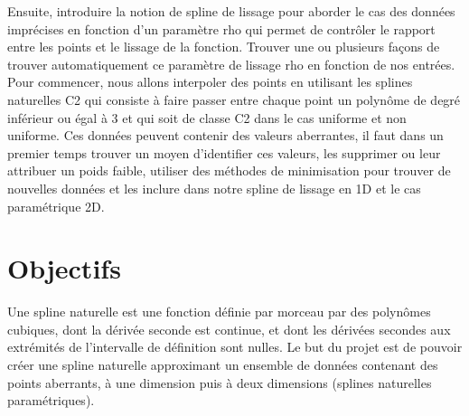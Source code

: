 \documentclass[a4paper,12pt]{article}
\begin{document}
Ensuite, introduire la notion de spline de lissage pour aborder le cas des données imprécises en fonction d’un paramètre rho qui permet de contrôler le rapport entre les points et le lissage de la fonction. Trouver une ou plusieurs façons de trouver automatiquement ce paramètre de lissage rho en fonction de nos entrées.
Pour commencer, nous allons interpoler des points en utilisant les splines naturelles C2 qui consiste à faire passer entre chaque point un polynôme de degré inférieur ou égal à 3 et qui soit de classe C2 dans le cas uniforme et non uniforme.
Ces données peuvent contenir des valeurs aberrantes, il faut dans un premier temps trouver un moyen d’identifier ces valeurs, les supprimer ou leur attribuer un poids faible, utiliser des méthodes de minimisation pour trouver de nouvelles données et les inclure dans notre spline de lissage en 1D et le cas paramétrique 2D.

\section{Objectifs}


Une spline naturelle est une fonction définie par morceau par des polynômes cubiques, dont la dérivée seconde est continue, et dont les dérivées secondes aux extrémités de l'intervalle de définition sont nulles.
Le but du projet est de pouvoir créer une spline naturelle approximant un ensemble de données contenant des points aberrants, à une dimension puis à deux dimensions (splines naturelles paramétriques).
\end{document}
